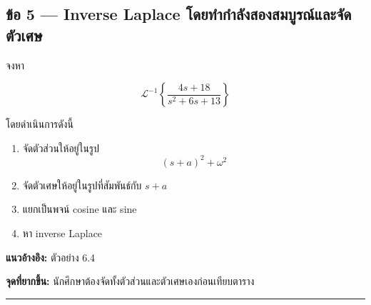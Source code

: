 \subsection{ข้อ 5 — Inverse Laplace โดยทำกำลังสองสมบูรณ์และจัดตัวเศษ}

จงหา

\[
\mathcal{L}^{-1}
\left\{
\frac{4s+18}
{s^2+6s+13}
\right\}
\]

โดยดำเนินการดังนี้

\begin{enumerate}
    \item จัดตัวส่วนให้อยู่ในรูป
    \[
    (s+a)^2+\omega^2
    \]
    \item จัดตัวเศษให้อยู่ในรูปที่สัมพันธ์กับ \(s+a\)
    \item แยกเป็นพจน์ cosine และ sine
    \item หา inverse Laplace
\end{enumerate}

\textbf{แนวอ้างอิง:} ตัวอย่าง 6.4

\textbf{จุดที่ยากขึ้น:} นักศึกษาต้องจัดทั้งตัวส่วนและตัวเศษเองก่อนเทียบตาราง

\par\noindent\rule{\textwidth}{0.4pt}\par


